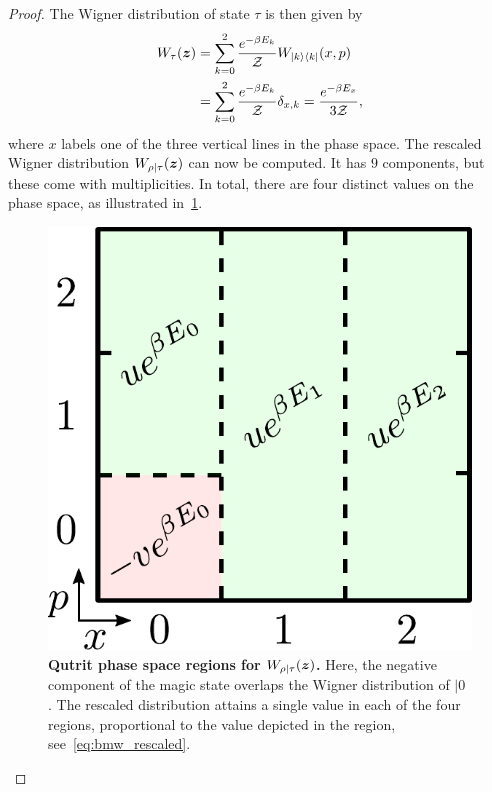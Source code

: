 \documentclass[pra,
aps,
twocolumn,
superscriptaddress,
groupedaddress,
nofootinbib,
reprint
]{revtex4-1}
\begin{document}
\begin{proof}
The Wigner distribution of state $\tau$ is then given by
\begin{align}
	\W[\bmz]{\tau} &= \sum\limits_{k=0}^2 \frac{e^{-\beta E_k}}{\Z}W_{|k\>\<k|}(x, p) \nonumber\\
	&= \sum\limits_{k=0}^2 \frac{e^{-\beta E_k}}{\Z} \delta_{x, k} = \frac{e^{-\beta E_x}}{3\Z},
\end{align}
where $x$ labels one of the three vertical lines in the phase space.
The rescaled Wigner distribution $W_{\rho|\tau}(\bm{z})$ can now be computed. It has $9$ components, but these come with multiplicities. In total, there are four distinct values on the phase space, as illustrated in~\cref{fig:pd_split}.
\begin{figure}[h]
    \centering
    \includegraphics[scale=0.35]{figs/pd_split_thermal.pdf}
    \caption{\textbf{Qutrit phase space regions for $W_{\rho | \tau}(\bm{z})$.}
    Here, the negative component of the magic state overlaps the Wigner distribution of $|0\>$. The rescaled distribution attains a single value in each of the four regions, proportional to the value depicted in the region, see~\cref{eq:bmw_rescaled}.
    }
    \label{fig:pd_split}
\end{figure}


\end{proof}
\end{document}
